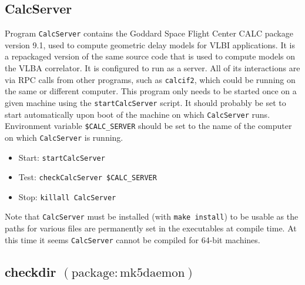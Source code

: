 
\subsection{CalcServer} \label{sec:CalcServer}

Program {\tt CalcServer} contains the Goddard Space Flight Center CALC package version 9.1, used to compute geometric delay models for VLBI applications.
It is a repackaged version of the same source code that is used to compute models on the VLBA correlator.
It is configured to run as a server.
All of its interactions are via RPC calls from other programs, such as {\tt calcif2}, which could be running on the same or different computer.
\newcommand{\oa}[1]{\hspace{-12pt}\makebox[12pt]{$\star$}#1}
This program only needs to be started once on a given machine using the {\tt startCalcServer} script.
It should probably be set to start automatically upon boot of the machine on which {\tt CalcServer} runs.
Environment variable {\tt \$CALC\_SERVER} should be set to the name of the computer on which {\tt CalcServer} is running.

\begin{itemize}
\item[] Start: {\tt startCalcServer}
\item[] Test: {\tt checkCalcServer \$CALC\_SERVER}
\item[] Stop: {\tt killall CalcServer}
\end{itemize}

\noindent
Note that {\tt CalcServer} must be installed (with {\tt make install}) to be usable as the paths for various files are permanently set in the executables at compile time.
At this time it seems {\tt CalcServer} cannot be compiled for 64-bit machines.








\subsection{checkdir {\small $\mathrm{(package: mk5daemon)}$}}

